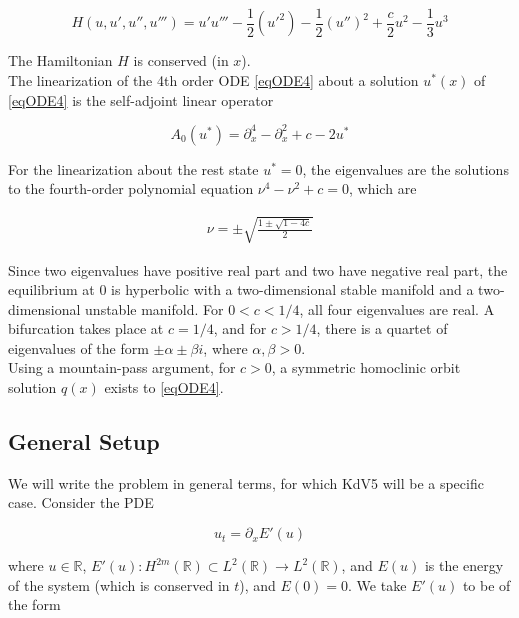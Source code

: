 \documentclass[12pt]{article}
\def\R{{\mathbb R}}
\begin{document}
\begin{equation}\label{Hamiltonian}
H(u, u', u'', u''') = u'u''' - \frac{1}{2}(u'^2) - \frac{1}{2}(u'')^2 + \frac{c}{2}u^2 - \frac{1}{3}u^3 
\end{equation}

The Hamiltonian $H$ is conserved (in $x$).\\

The linearization of the 4th order ODE \eqref{eqODE4} about a solution $u^*(x)$ of \eqref{eqODE4} is the self-adjoint linear operator

\begin{equation}\label{defA0}
A_0(u^*) = \partial_x^4 - \partial_x^2 + c - 2 u^* 
\end{equation}

For the linearization about the rest state $u^* = 0$, the eigenvalues are the solutions to the fourth-order polynomial equation $\nu^4 - \nu^2 + c = 0$, which are

\begin{align}\label{specA0}
\nu = \pm \sqrt{ \frac{1 \pm \sqrt{1 - 4c} }{2}}
\end{align}

Since two eigenvalues have positive real part and two have negative real part, the equilibrium at 0 is hyperbolic with a two-dimensional stable manifold and a two-dimensional unstable manifold. For $0 < c < 1/4$, all four eigenvalues are real. A bifurcation takes place at $c = 1/4$, and for $c > 1/4$, there is a quartet of eigenvalues of the form $\pm \alpha \pm \beta i$, where $\alpha, \beta > 0$.\\

Using a mountain-pass argument, for $c > 0$, a symmetric homoclinic orbit solution $q(x)$ exists to \eqref{eqODE4}.

\subsection{General Setup}

We will write the problem in general terms, for which KdV5 will be a specific case. Consider the PDE

\begin{equation}\label{genPDE}
u_t = \partial_x E'(u)
\end{equation}

where $u \in \R$, $E'(u): H^{2m}(\R) \subset L^2(\R) \rightarrow L^2(\R)$, and $E(u)$ is the energy of the system (which is conserved in $t$), and $E(0) = 0$. We take $E'(u)$ to be of the form
\end{document}
